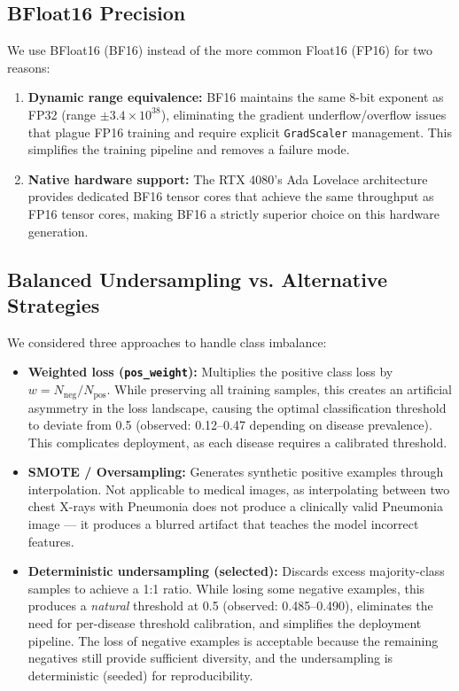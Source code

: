 \documentclass[12pt,a4paper]{report}
\begin{document}
\subsection{BFloat16 Precision}

We use BFloat16 (BF16) instead of the more common Float16 (FP16) for two reasons:

\begin{enumerate}
    \item \textbf{Dynamic range equivalence:} BF16 maintains the same 8-bit exponent as FP32 (range $\pm 3.4 \times 10^{38}$), eliminating the gradient underflow/overflow issues that plague FP16 training and require explicit \texttt{GradScaler} management. This simplifies the training pipeline and removes a failure mode.
    
    \item \textbf{Native hardware support:} The RTX 4080's Ada Lovelace architecture provides dedicated BF16 tensor cores that achieve the same throughput as FP16 tensor cores, making BF16 a strictly superior choice on this hardware generation.
\end{enumerate}

\subsection{Balanced Undersampling vs. Alternative Strategies}

We considered three approaches to handle class imbalance:

\begin{itemize}
    \item \textbf{Weighted loss (\texttt{pos\_weight}):} Multiplies the positive class loss by $w = N_{\text{neg}} / N_{\text{pos}}$. While preserving all training samples, this creates an artificial asymmetry in the loss landscape, causing the optimal classification threshold to deviate from 0.5 (observed: 0.12--0.47 depending on disease prevalence). This complicates deployment, as each disease requires a calibrated threshold.
    
    \item \textbf{SMOTE / Oversampling:} Generates synthetic positive examples through interpolation. Not applicable to medical images, as interpolating between two chest X-rays with Pneumonia does not produce a clinically valid Pneumonia image --- it produces a blurred artifact that teaches the model incorrect features.
    
    \item \textbf{Deterministic undersampling (selected):} Discards excess majority-class samples to achieve a 1:1 ratio. While losing some negative examples, this produces a \textit{natural} threshold at 0.5 (observed: 0.485--0.490), eliminates the need for per-disease threshold calibration, and simplifies the deployment pipeline. The loss of negative examples is acceptable because the remaining negatives still provide sufficient diversity, and the undersampling is deterministic (seeded) for reproducibility.
\end{itemize}
\end{document}
